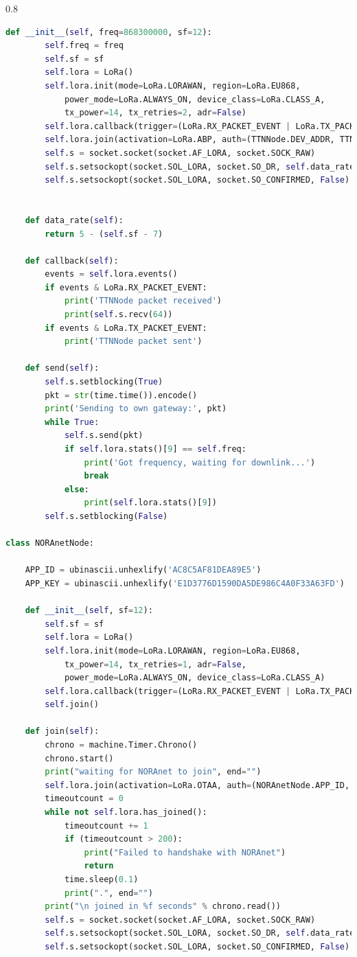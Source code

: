 \documentclass[12pt]{article}
\begin{document}
\begin{spacing}{0.8}
\begin{lstlisting}[language=Python]
    def __init__(self, freq=868300000, sf=12):
        self.freq = freq
        self.sf = sf
        self.lora = LoRa()
        self.lora.init(mode=LoRa.LORAWAN, region=LoRa.EU868,
            power_mode=LoRa.ALWAYS_ON, device_class=LoRa.CLASS_A,
            tx_power=14, tx_retries=2, adr=False)
        self.lora.callback(trigger=(LoRa.RX_PACKET_EVENT | LoRa.TX_PACKET_EVENT), handler=self.callback)
        self.lora.join(activation=LoRa.ABP, auth=(TTNNode.DEV_ADDR, TTNNode.NWK_KEY, TTNNode.APP_KEY), timeout=0, dr=self.data_rate())
        self.s = socket.socket(socket.AF_LORA, socket.SOCK_RAW)
        self.s.setsockopt(socket.SOL_LORA, socket.SO_DR, self.data_rate())   # Data Rate
        self.s.setsockopt(socket.SOL_LORA, socket.SO_CONFIRMED, False)       # ACK


    def data_rate(self):
        return 5 - (self.sf - 7)

    def callback(self):
        events = self.lora.events()
        if events & LoRa.RX_PACKET_EVENT:
            print('TTNNode packet received')
            print(self.s.recv(64))
        if events & LoRa.TX_PACKET_EVENT:
            print('TTNNode packet sent')

    def send(self):
        self.s.setblocking(True)
        pkt = str(time.time()).encode()
        print('Sending to own gateway:', pkt)
        while True:
            self.s.send(pkt)
            if self.lora.stats()[9] == self.freq:
                print('Got frequency, waiting for downlink...')
                break
            else:
                print(self.lora.stats()[9])
        self.s.setblocking(False)

class NORAnetNode:

    APP_ID = ubinascii.unhexlify('AC8C5AF81DEA89E5')
    APP_KEY = ubinascii.unhexlify('E1D3776D1590DA5DE986C4A0F33A63FD')

    def __init__(self, sf=12):
        self.sf = sf
        self.lora = LoRa()
        self.lora.init(mode=LoRa.LORAWAN, region=LoRa.EU868,
            tx_power=14, tx_retries=1, adr=False,
            power_mode=LoRa.ALWAYS_ON, device_class=LoRa.CLASS_A)
        self.lora.callback(trigger=(LoRa.RX_PACKET_EVENT | LoRa.TX_PACKET_EVENT), handler=self.callback)
        self.join()

    def join(self):
        chrono = machine.Timer.Chrono()
        chrono.start()
        print("waiting for NORAnet to join", end="")
        self.lora.join(activation=LoRa.OTAA, auth=(NORAnetNode.APP_ID, NORAnetNode.APP_KEY), timeout=0, dr=self.data_rate())
        timeoutcount = 0
        while not self.lora.has_joined():
            timeoutcount += 1
            if (timeoutcount > 200):
                print("Failed to handshake with NORAnet")
                return
            time.sleep(0.1)
            print(".", end="")
        print("\n joined in %f seconds" % chrono.read())
        self.s = socket.socket(socket.AF_LORA, socket.SOCK_RAW)
        self.s.setsockopt(socket.SOL_LORA, socket.SO_DR, self.data_rate())   # Data Rate
        self.s.setsockopt(socket.SOL_LORA, socket.SO_CONFIRMED, False)       # ACK


\end{lstlisting}
\end{spacing}
\end{document}
